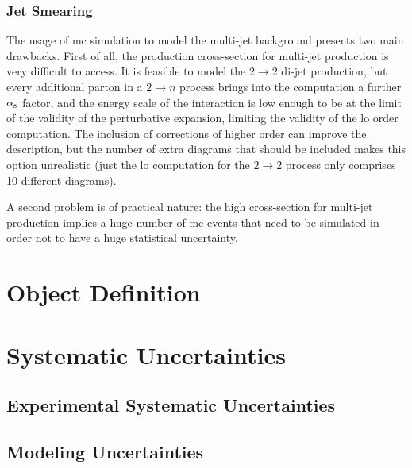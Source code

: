 \subsubsection{Jet Smearing}
\label{sec:jet_smearing}

The usage of \gls{mc} simulation to model the multi-jet background presents two main drawbacks.
First of all, the production cross-section for multi-jet production is very difficult to access. 
It is feasible to model the $2 \to 2$ di-jet production, 
but every additional parton in a $2 \to n$ process brings into the computation a further $\alpha_{\rm{s}}$ factor, 
and the energy scale of the interaction is low enough to be at the limit of the validity of the perturbative expansion, limiting the validity of the \gls{lo} order computation. The inclusion of corrections of higher order can improve the description, but the number of extra diagrams that should be included makes this option unrealistic (just the \gls{lo} computation for the $2 \to 2$ process only comprises 10 different diagrams).

A second problem is of practical nature: the high cross-section for multi-jet production implies a huge number of \gls{mc} events that need to be simulated in order not to have a huge statistical uncertainty. 


\section{Object Definition}
\label{sec:common_obj_def}

\section{Systematic Uncertainties}
\label{sec:common_syst}

\subsection{Experimental Systematic Uncertainties}

\subsection{Modeling Uncertainties} 

